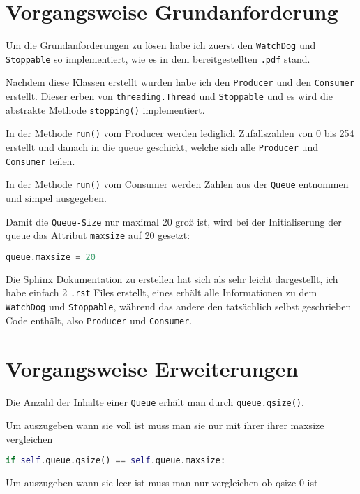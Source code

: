 
\section{Vorgangsweise Grundanforderung}
Um die Grundanforderungen zu lösen habe ich zuerst den \verb|WatchDog| und \verb|Stoppable| so implementiert, wie es in dem bereitgestellten \verb|.pdf| stand.

Nachdem diese Klassen erstellt wurden habe ich den \verb|Producer| und den \verb|Consumer| erstellt. Dieser erben von \verb|threading.Thread| und \verb|Stoppable| und es wird die abstrakte Methode \verb|stopping()| implementiert. 

In der Methode \verb|run()| vom Producer werden lediglich Zufallszahlen von 0 bis 254 erstellt und danach in die queue geschickt, welche sich alle \verb|Producer| und \verb|Consumer| teilen. 

In der Methode \verb|run()| vom Consumer werden Zahlen aus der \verb|Queue| entnommen und simpel ausgegeben.

Damit die \verb|Queue-Size| nur maximal 20 groß ist, wird bei der Initialiserung der queue das Attribut \verb|maxsize| auf 20 gesetzt:

\begin{lstlisting}[language=Python]
queue.maxsize = 20
\end{lstlisting}

Die Sphinx Dokumentation zu erstellen hat sich als sehr leicht dargestellt, ich habe einfach 2 \verb|.rst| Files erstellt, eines erhält alle Informationen zu dem \verb|WatchDog| und \verb|Stoppable|, während das andere den tatsächlich selbst geschrieben Code enthält, also \verb|Producer| und \verb|Consumer|.

\section{Vorgangsweise Erweiterungen}
Die Anzahl der Inhalte einer \verb|Queue| erhält man durch \verb|queue.qsize()|.

Um auszugeben wann sie voll ist muss man sie nur mit ihrer ihrer maxsize vergleichen

\begin{lstlisting}[language=Python]
if self.queue.qsize() == self.queue.maxsize:
\end{lstlisting}

Um auszugeben wann sie leer ist muss man nur vergleichen ob qsize 0 ist

